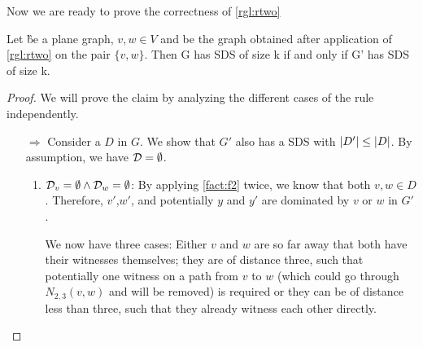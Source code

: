 \noindent Now we are ready to prove the correctness of \cref{rgl:rtwo}
\begin{lemma}\label{lemma:correctnesstwo}
    Let \G be a plane graph, $v, w \in V$ and \GB be the graph obtained after application of \cref{rgl:rtwo} on the pair $\{v, w\}$. Then G has SDS of size k if and only if G' has SDS of size k.
\end{lemma}
\begin{proof}
    We will prove the claim by analyzing the different cases of the rule independently.     
    \begin{enumerate}
        \item[$\Rightarrow$] Consider a \sdom $D$ in $G$. We show that $G'$ also has a SDS with $\abs{D'} \leq \abs{D}$. By assumption, we have $\mathcal{D} = \emptyset$.
        \begin{enumerate}
            \item  $ \mathcal{D}_{v} = \emptyset  \wedge \mathcal{D}_{w} = \emptyset $: By applying \cref{fact:f2} twice, we know that both  $v, w \in D$. Therefore, $v'$,$w'$, and potentially $y$ and $y'$ are dominated by $v$ or $w$ in $G'$.
            
            We now have three cases: Either $v$ and $w$ are so far away that both have their witnesses themselves; they are of distance three, such that potentially one witness on a path from $v$ to $w$ (which could go through $N_{2,3}(v,w)$ and will be removed) is required or they can be of distance less than three, such that they already witness each other directly. 


\end{enumerate}
\end{enumerate}
\end{proof}
